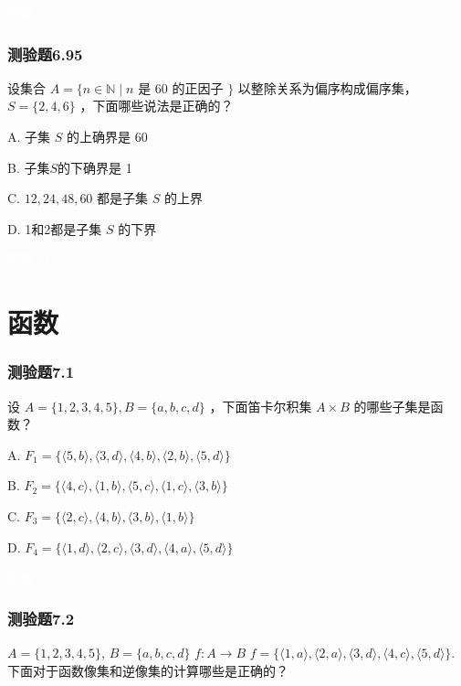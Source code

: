 \documentclass[UTF8, heading=true]{ctexart}
\begin{document}
\textcolor{white}{答案：CD}

\subsubsection{测验题6.95}

设集合 $A=\{n \in \mathbb{N} \mid n$ 是 60 的正因子 $\}$ 以整除关系为偏序构成偏序集，$S=\{2,4,6\}$ ，下面哪些说法是正确的？

A. 子集 $S$ 的上确界是 60

B. 子集$S$的下确界是 1

C.  $12,24,48,60$ 都是子集 $S$ 的上界

D. 1和2都是子集 $S$ 的下界

\textcolor{white}{答案：D}




\clearpage

\section{函数}

\subsubsection{测验题7.1}

设 $A=\{1,2,3,4,5\}, B=\{a, b, c, d\}$ ，下面笛卡尔积集 $A \times B$ 的哪些子集是函数？

A. $F_1=\{\langle 5, b\rangle,\langle 3, d\rangle,\langle 4, b\rangle,\langle 2, b\rangle,\langle 5, d\rangle\}$

B. $F_2=\{\langle 4, c\rangle,\langle 1, b\rangle,\langle 5, c\rangle,\langle 1, c\rangle,\langle 3, b\rangle\}$

C. $F_3=\{\langle 2, c\rangle,\langle 4, b\rangle,\langle 3, b\rangle,\langle 1, b\rangle\}$

D. $F_4=\{\langle 1, d\rangle,\langle 2, c\rangle,\langle 3, d\rangle,\langle 4, a\rangle,\langle 5, d\rangle\}$



\textcolor{white}{答案：D}

\subsubsection{测验题7.2}


 $A=\{1,2,3,4,5\}$, $B=\{a, b, c, d\}$  $f: A \rightarrow B$  $f=\{\langle 1, a\rangle,\langle 2, a\rangle,\langle 3, d\rangle,\langle 4, c\rangle,\langle 5, d\rangle\}$.
下面对于函数像集和逆像集的计算哪些是正确的？
\end{document}
